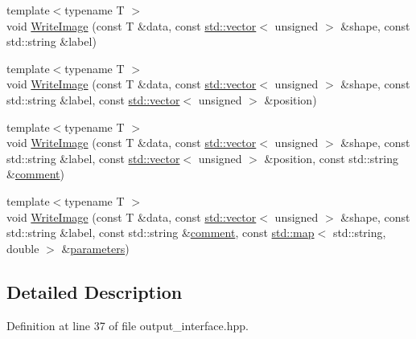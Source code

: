 \begin{DoxyCompactItemize}
\item 
{\footnotesize template$<$typename T $>$ }\\void \hyperlink{class_q_s_t_e_m_1_1_i_data_writer_a23b76b848b0fa40709fb8848ab627036}{Write\-Image} (const T \&data, const \hyperlink{qmb_8m_af54b69a32590de218622e869b06b47b3}{std\-::vector}$<$ unsigned $>$ \&shape, const std\-::string \&label)
\item 
{\footnotesize template$<$typename T $>$ }\\void \hyperlink{class_q_s_t_e_m_1_1_i_data_writer_a4ec7e9232de84a597a0bad2e571b4e8b}{Write\-Image} (const T \&data, const \hyperlink{qmb_8m_af54b69a32590de218622e869b06b47b3}{std\-::vector}$<$ unsigned $>$ \&shape, const std\-::string \&label, const \hyperlink{qmb_8m_af54b69a32590de218622e869b06b47b3}{std\-::vector}$<$ unsigned $>$ \&position)
\item 
{\footnotesize template$<$typename T $>$ }\\void \hyperlink{class_q_s_t_e_m_1_1_i_data_writer_a4159ae9c36d4f61aeafd1a9efaa975b1}{Write\-Image} (const T \&data, const \hyperlink{qmb_8m_af54b69a32590de218622e869b06b47b3}{std\-::vector}$<$ unsigned $>$ \&shape, const std\-::string \&label, const \hyperlink{qmb_8m_af54b69a32590de218622e869b06b47b3}{std\-::vector}$<$ unsigned $>$ \&position, const std\-::string \&\hyperlink{image_sim_8m_aea4cc4bd8e43a7f8ebf9b0ee3da8d681}{comment})
\item 
{\footnotesize template$<$typename T $>$ }\\void \hyperlink{class_q_s_t_e_m_1_1_i_data_writer_a275c34968237b68327c0c42030905e37}{Write\-Image} (const T \&data, const \hyperlink{qmb_8m_af54b69a32590de218622e869b06b47b3}{std\-::vector}$<$ unsigned $>$ \&shape, const std\-::string \&label, const std\-::string \&\hyperlink{image_sim_8m_aea4cc4bd8e43a7f8ebf9b0ee3da8d681}{comment}, const \hyperlink{_displacement_params_8m_af619c74fd72bdb64d115463dff2720cd}{std\-::map}$<$ std\-::string, double $>$ \&\hyperlink{sim_image_from_wave_8m_acb6d7970e73c00effe1d16e23142f11d}{parameters})
\end{DoxyCompactItemize}


\subsection{Detailed Description}


Definition at line 37 of file output\-\_\-interface.\-hpp.



